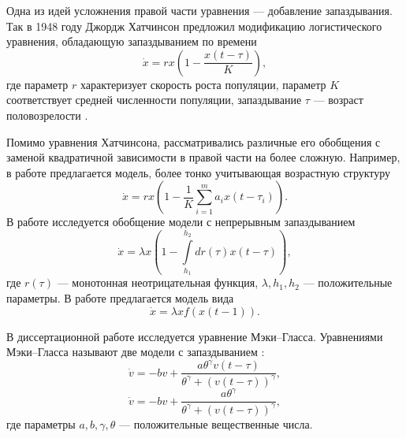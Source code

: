 
Одна из идей усложнения правой части уравнения --- добавление запаздывания. Так в 1948 году Джордж Хатчинсон предложил модификацию логистического уравнения, обладающую запаздыванием по времени
%
\begin{equation}
	\dot{x}=rx\left(1 - \frac{x(t-\tau)}{K}\right),
\end{equation}
%
где параметр $r$ характеризует скорость роста популяции, параметр $K$ соответствует средней численности популяции, запаздывание $\tau$ --- возраст половозрелости \cite{Hutchinson1948}. %

Помимо уравнения Хатчинсона, рассматривались различные его обобщения с заменой квадратичной зависимости в правой части на более сложную. Например, в работе \cite{Glyzin2007} предлагается модель, более тонко учитывающая возрастную структуру
\begin{equation}
	\dot{x}=rx\left(1 - \frac{1}{K}\sum\limits_{i = 1}^{m} a_i x(t-\tau_i)\right).
\end{equation}
%
В работе \cite{Kaschenko2012} исследуется обобщение модели с непрерывным запаздыванием
\begin{equation}
	\dot{x} = \lambda x \left(1 - \int\limits_{h_1}^{h_2}dr(\tau)x(t - \tau)\right),
\end{equation}
где $r(\tau)$ --- монотонная неотрицательная функция, $\lambda, h_1, h_2$ --- положительные параметры.
%
В работе \cite{Kolesov2010} предлагается модель вида
\begin{equation}
	\dot{x} = \lambda x f(x(t - 1)).
\end{equation}

%
%

В диссертационной работе исследуется уравнение Мэки--Гласса. Уравнениями Мэки--Гласса называют две модели с запаздыванием \cite{Mackey1977, Glass1988}:
\begin{equation}
	\label{eq:mg_equation_1:intro}
	\dot{v}=-b v+\frac{a \theta^{\gamma} v(t-\tau)}{\theta^{\gamma}+(v(t-\tau))^{\gamma}},
\end{equation}
\begin{equation}
	\label{eq:mg_equation_2:intro}
	\dot{v}=-b v+\frac{a \theta^{\gamma}}{\theta^{\gamma}+(v(t-\tau))^{\gamma}},
\end{equation}
где параметры $a, b, \gamma, \theta$ --- положительные вещественные числа.

